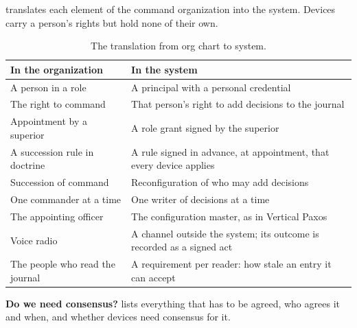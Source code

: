 \documentclass[11pt,a4paper]{article}
\begin{document}
 translates each element of the command organization into the system.
Devices carry a person's rights but hold none of their own.

\begin{table}[htbp]
\centering
\caption{The translation from org chart to system.}
\label{tab:translation}
\small
\begin{tabularx}{\linewidth}{@{}P{5.6cm}L@{}}
\toprule
\textbf{In the organization} & \textbf{In the system} \\
\midrule
A person in a role & A principal with a personal credential \\
The right to command & That person's right to add decisions to the journal \\
Appointment by a superior & A role grant signed by the superior \\
A succession rule in doctrine & A rule signed in advance, at appointment, that every device
  applies \\
Succession of command & Reconfiguration of who may add decisions \\
One commander at a time & One writer of decisions at a time \\
The appointing officer & The configuration master, as in Vertical Paxos \\
Voice radio & A channel outside the system; its outcome is recorded as a signed act \\
The people who read the journal & A requirement per reader: how stale an entry it can accept \\
\bottomrule
\end{tabularx}
\end{table}

\textbf{Do we need consensus?}  lists everything that has to be agreed,
who agrees it and when, and whether devices need consensus for it.
\end{document}
